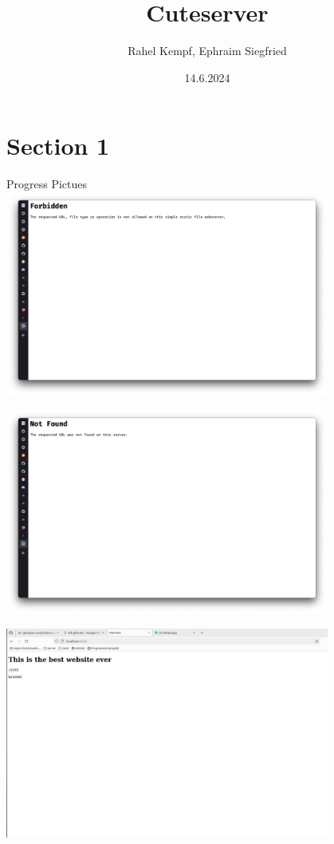 \documentclass[aspectratio=169]{beamer}
\title              {Cuteserver}
\author             {Rahel Kempf, Ephraim Siegfried}
\institute          {Operating Systems, University of Basel}
\date               {14.6.2024}
\begin{document}
\begin{frame}[t,plain]
\titlepage
\end{frame}


\section{Section 1}	%

\begin{frame}[c]{Progress Pictues}
  \centering
\includegraphics[width=0.8\textwidth]{00_errors.png}
\end{frame}

\begin{frame}[c]{}
  \centering
\includegraphics[width=0.8\textwidth]{00_errors1.png}
\end{frame}

\begin{frame}[c]{}
  \centering
\includegraphics[width=0.8\textwidth]{01_bare_html.png}
\end{frame}
\end{document}
